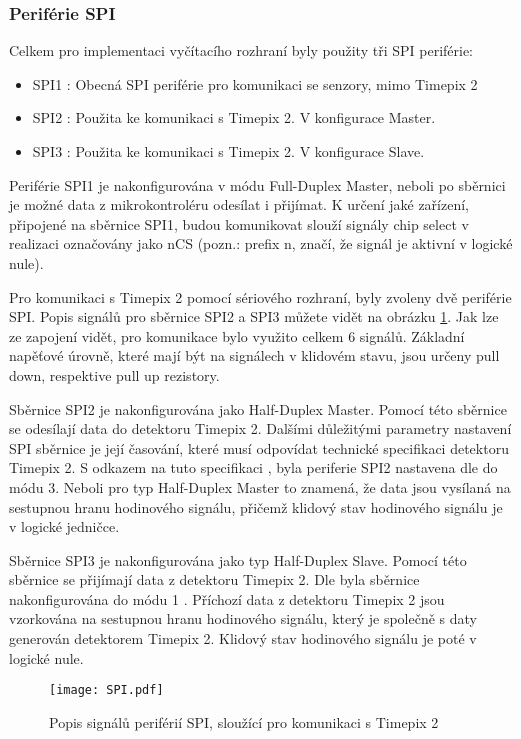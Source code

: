 	\subsubsection{Periférie SPI}
	Celkem pro implementaci vyčítacího rozhraní byly použity tři SPI periférie:
	 \begin{itemize}
	 	\setlength\itemsep{0.005em}
	 	\item SPI1 : Obecná SPI periférie pro komunikaci se senzory, mimo Timepix 2
	 	\item SPI2 : Použita ke komunikaci s Timepix 2. V konfigurace Master. 
	 	\item SPI3 : Použita ke komunikaci s Timepix 2. V konfigurace Slave.
	 \end{itemize}
 	Periférie SPI1 je nakonfigurována v módu Full-Duplex Master, neboli po sběrnici je možné data z mikrokontroléru odesílat i přijímat. K určení jaké zařízení, připojené na sběrnice SPI1, budou komunikovat slouží signály chip select v realizaci označovány jako nCS (pozn.: prefix n, značí, že signál je aktivní v logické nule). 
 	\par Pro komunikaci s Timepix 2 pomocí sériového rozhraní, byly zvoleny dvě periférie SPI. Popis signálů pro sběrnice SPI2 a SPI3 můžete vidět na obrázku \ref{fig:SPI}. Jak lze ze zapojení vidět, pro komunikace bylo využito celkem 6 signálů. Základní napěťové úrovně, které mají být na signálech v klidovém stavu, jsou určeny pull down, respektive pull up rezistory. 
 	\par Sběrnice SPI2 je nakonfigurována jako Half-Duplex Master. Pomocí této sběrnice se odesílají data do detektoru Timepix 2. Dalšími důležitými parametry nastavení SPI sběrnice je její časování, které musí odpovídat technické specifikaci detektoru Timepix 2. S odkazem na tuto specifikaci \cite{Timepix2}, byla periferie SPI2 nastavena dle \cite{SPI} do módu 3. Neboli pro typ Half-Duplex Master to znamená, že data jsou vysílaná na sestupnou hranu hodinového signálu, přičemž klidový stav hodinového signálu je v logické jedničce.
 	\par Sběrnice SPI3 je nakonfigurována jako typ Half-Duplex Slave. Pomocí této sběrnice se přijímají data z detektoru Timepix 2. Dle \cite{Timepix2} byla sběrnice nakonfigurována do módu 1 \cite{SPI}. Příchozí data z detektoru Timepix 2 jsou vzorkována na sestupnou hranu hodinového signálu, který je společně s daty generován detektorem Timepix 2. Klidový stav hodinového signálu je poté v logické nule.
	\begin{figure}[h!]
 		\centering
 		\captionsetup{justification=centering}
 		\texttt{[image: SPI.pdf]}
 		\caption{Popis signálů periférií SPI, sloužící pro komunikaci s Timepix 2} 
 		\label{fig:SPI}
 	\end{figure}
 	
